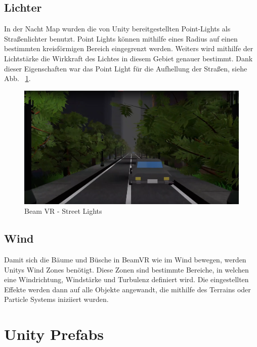 \subsection{Lichter}\label{subsec:light-effect}
In der Nacht Map wurden die von Unity bereitgestellten Point-Lights als Straßenlichter benutzt.
Point Lights k\"onnen mithilfe eines Radius auf einen bestimmten kreisf\"ormigen Bereich eingegrenzt werden.
Weiters wird mithilfe der Lichtst\"arke die Wirkkraft des Lichtes in diesem Gebiet genauer bestimmt.
Dank dieser Eigenschaften war das Point Light f\"ur die Aufhellung der Straßen, siehe Abb. ~\ref{fig:beamvr_street_lights}.
~\cite{Unity_PointLights_2022}
\begin {figure}
    \centering
    \includegraphics[scale=0.3]{pics/beamvr_point_lights}
    \caption{Beam VR - Street Lights}
    \label{fig:beamvr_street_lights}
\end {figure}

\subsection{Wind}\label{subsec:wind-effect}
Damit sich die B\"aume und B\"usche in BeamVR wie im Wind bewegen, werden Unitys Wind Zones ben\"otigt.
Diese Zonen sind bestimmte Bereiche, in welchen eine Windrichtung, Windst\"arke und Turbulenz definiert wird.
Die eingestellten Effekte werden dann auf alle Objekte angewandt, die mithilfe des Terrains oder Particle Systems iniziiert wurden.
~\cite{Unity_WindZones_2022}

\section{Unity Prefabs}
\label{sec:prefabs}


